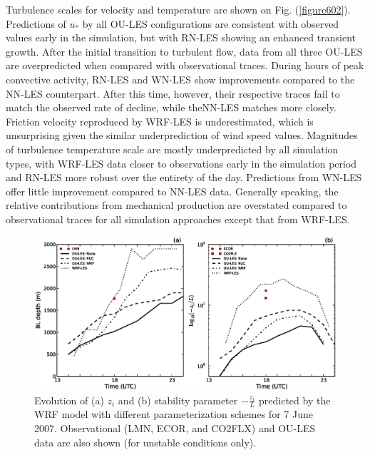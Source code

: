 Turbulence scales for velocity and temperature are shown on Fig. (\autoref{figure602}). Predictions of $u_*$ by all OU-LES configurations are consistent with observed values early in the simulation, but with RN-LES showing an enhanced transient growth. After the initial transition to turbulent flow, data from all three OU-LES are overpredicted when compared with observational traces. During hours of peak convective activity, RN-LES and WN-LES show improvements compared to the NN-LES counterpart. After this time, however, their respective traces fail to match the observed rate of decline, while theNN-LES matches more closely. Friction velocity reproduced by WRF-LES is underestimated, which is unsurprising given the similar underprediction of wind speed values. Magnitudes of turbulence temperature scale are mostly underpredicted by all simulation types, with WRF-LES data closer to observations early in the simulation period and RN-LES more robust over the entirety of the day. Predictions from WN-LES offer little improvement compared to NN-LES data. Generally speaking, the relative contributions from mechanical production are overstated compared to observational traces for all simulation approaches except that from WRF-LES. 


\begin{figure}[H]
\begin{center}
\includegraphics[width=\textwidth]{figures/chapter6/pblh_phi_20070607}
\end{center}
\caption{Evolution of (a) $z_i$ and (b) stability parameter $-\frac{z_i}{L}$ predicted by the WRF model with different parameterization schemes for 7 June 2007. Observational (LMN, ECOR, and CO2FLX) and OU-LES data are also shown (for unstable conditions only).}
\label{figure603}
\end{figure}


